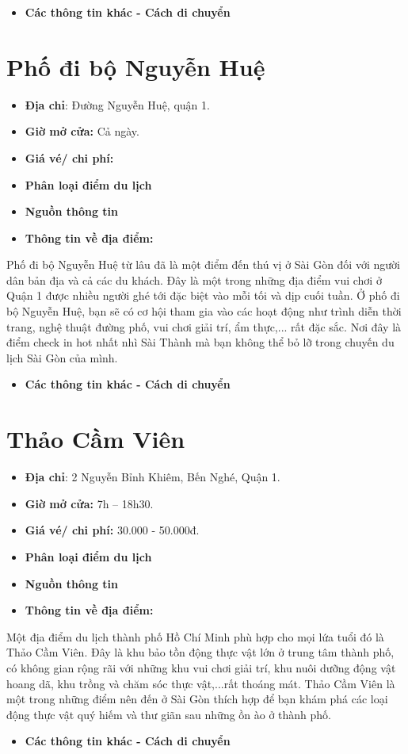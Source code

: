 \documentclass{article}
\begin{document}
\begin{itemize}
    \item{\textbf{Các thông tin khác - Cách di chuyển}}
\end{itemize}

\section{Phố đi bộ Nguyễn Huệ}
\begin{itemize}
    \item{\textbf{Địa chỉ}: Đường Nguyễn Huệ, quận 1.}
    \item{\textbf{Giờ mở cửa:} Cả ngày.}
    \item{\textbf{Giá vé/ chi phí:}}
    \item{\textbf{Phân loại điểm du lịch} }
    \item{\textbf{Nguồn thông tin}}
    \item{\textbf{Thông tin về địa điểm:}}
\end{itemize}
Phố đi bộ Nguyễn Huệ từ lâu đã là một điểm đến thú vị ở Sài Gòn đối với người dân bản địa và cả các du khách. Đây là một trong những địa điểm vui chơi ở Quận 1 được nhiều người ghé tới đặc biệt vào mỗi tối và dịp cuối tuần. Ở phố đi bộ Nguyễn Huệ, bạn sẽ có cơ hội tham gia vào các hoạt động như trình diễn thời trang, nghệ thuật đường phố, vui chơi giải trí, ẩm thực,... rất đặc sắc. Nơi đây là điểm check in hot nhất nhì Sài Thành mà bạn không thể bỏ lỡ trong chuyến du lịch Sài Gòn của mình.
\begin{itemize}
    \item{\textbf{Các thông tin khác - Cách di chuyển}}
\end{itemize}

\section{Thảo Cầm Viên}
\begin{itemize}
    \item{\textbf{Địa chỉ}: 2 Nguyễn Bỉnh Khiêm, Bến Nghé, Quận 1.}
    \item{\textbf{Giờ mở cửa:} 7h – 18h30.}
    \item{\textbf{Giá vé/ chi phí:} 30.000 - 50.000đ.}
    \item{\textbf{Phân loại điểm du lịch} }
    \item{\textbf{Nguồn thông tin}}
    \item{\textbf{Thông tin về địa điểm:}}
\end{itemize}
Một địa điểm du lịch thành phố Hồ Chí Minh phù hợp cho mọi lứa tuổi đó là Thảo Cầm Viên. Đây là khu bảo tồn động thực vật lớn ở trung tâm thành phố, có không gian rộng rãi với những khu vui chơi giải trí, khu nuôi dưỡng động vật hoang dã, khu trồng và chăm sóc thực vật,...rất thoáng mát. Thảo Cầm Viên là một trong những điểm nên đến ở Sài Gòn thích hợp để bạn khám phá các loại động thực vật quý hiếm và thư giãn sau những ồn ào ở thành phố.
\begin{itemize}
    \item{\textbf{Các thông tin khác - Cách di chuyển}}
\end{itemize}
\end{document}
